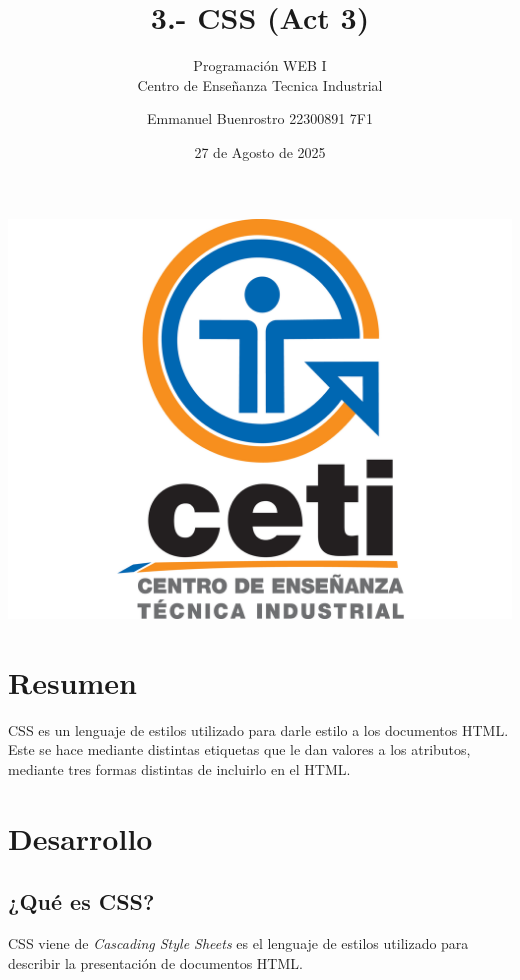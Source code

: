 \documentclass[11pt]{scrartcl}
\title {3.- CSS (Act 3)}
\subtitle{Programación WEB I \\ Centro de Enseñanza Tecnica Industrial}
\date{27 de Agosto de 2025}
\author{Emmanuel Buenrostro 22300891 7F1}
\begin{document}
\maketitle


\begin{center}
   \includegraphics[scale=0.15]{../cetilogo.jpg} 
\end{center}
\newpage
\tableofcontents


\section{Resumen}

CSS es un lenguaje de estilos utilizado para darle estilo a los documentos HTML. \\
Este se hace mediante distintas etiquetas que le dan valores a los atributos, mediante tres formas distintas de incluirlo en el HTML.

\section{Desarrollo}

\subsection{¿Qué es CSS?}

CSS viene de \textit{Cascading Style Sheets} es el lenguaje de estilos 
utilizado para describir la presentación de documentos HTML.  \\
\end{document}
